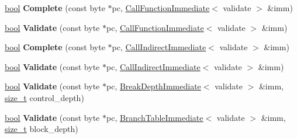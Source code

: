 \begin{DoxyCompactItemize}
\item 
\mbox{\label{classv8_1_1internal_1_1wasm_1_1WasmDecoder_a246a2e8b4e46cd307ad706c57fdfc71d}} 
\mbox{\hyperlink{classbool}{bool}} {\bfseries Complete} (const byte $\ast$pc, \mbox{\hyperlink{structv8_1_1internal_1_1wasm_1_1CallFunctionImmediate}{Call\+Function\+Immediate}}$<$ validate $>$ \&imm)
\item 
\mbox{\label{classv8_1_1internal_1_1wasm_1_1WasmDecoder_af8f3d808001c36b212c3553bedb210a1}} 
\mbox{\hyperlink{classbool}{bool}} {\bfseries Validate} (const byte $\ast$pc, \mbox{\hyperlink{structv8_1_1internal_1_1wasm_1_1CallFunctionImmediate}{Call\+Function\+Immediate}}$<$ validate $>$ \&imm)
\item 
\mbox{\label{classv8_1_1internal_1_1wasm_1_1WasmDecoder_a9526636ca68b0bd9525ec3d0d2b5d349}} 
\mbox{\hyperlink{classbool}{bool}} {\bfseries Complete} (const byte $\ast$pc, \mbox{\hyperlink{structv8_1_1internal_1_1wasm_1_1CallIndirectImmediate}{Call\+Indirect\+Immediate}}$<$ validate $>$ \&imm)
\item 
\mbox{\label{classv8_1_1internal_1_1wasm_1_1WasmDecoder_acea466a1d473de47565868592d53f11f}} 
\mbox{\hyperlink{classbool}{bool}} {\bfseries Validate} (const byte $\ast$pc, \mbox{\hyperlink{structv8_1_1internal_1_1wasm_1_1CallIndirectImmediate}{Call\+Indirect\+Immediate}}$<$ validate $>$ \&imm)
\item 
\mbox{\label{classv8_1_1internal_1_1wasm_1_1WasmDecoder_ada82822a6add3db11e9ea8156af3d8f0}} 
\mbox{\hyperlink{classbool}{bool}} {\bfseries Validate} (const byte $\ast$pc, \mbox{\hyperlink{structv8_1_1internal_1_1wasm_1_1BreakDepthImmediate}{Break\+Depth\+Immediate}}$<$ validate $>$ \&imm, \mbox{\hyperlink{classsize__t}{size\+\_\+t}} control\+\_\+depth)
\item 
\mbox{\label{classv8_1_1internal_1_1wasm_1_1WasmDecoder_aefc38ef3136e97fa7387fd765d2360d1}} 
\mbox{\hyperlink{classbool}{bool}} {\bfseries Validate} (const byte $\ast$pc, \mbox{\hyperlink{structv8_1_1internal_1_1wasm_1_1BranchTableImmediate}{Branch\+Table\+Immediate}}$<$ validate $>$ \&imm, \mbox{\hyperlink{classsize__t}{size\+\_\+t}} block\+\_\+depth)

\end{DoxyCompactItemize}
